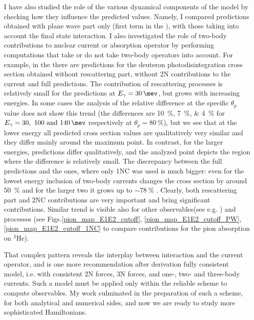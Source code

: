 I have also studied the role of the various dynamical components of the model by checking 
how they influence the predicted values.
Namely, I compared predictions obtained with plane wave part only (first term in the ),
with those taking into account the final state interaction.
I also investigated the role of two-body contributions to nuclear current or absorption operator
by performing computations that take or do not take two-body operators into account.
For example, in the  there are predictions for the deuteron photodisintegration 
cross section obtained 
without rescattering part, without 2N contributions to the current and full predictions.
The contribution of rescattering processes is relatively small for the predictions at $E_\gamma = \SI{30}{\mev}$,
but grows with increasing energies. In some cases the analysis of the relative difference at the specific 
$\theta_p$ value does not show this trend (the differences are \SIlist{10;7;4}{\percent} 
for $E_\gamma=\SIlist[list-units = single]{30;100;140}{\mev}$ respectively at $\theta_p=\SI{80}{\percent}$),
but we see that
at the lower energy all predicted cross section values are qualitatively very similar and they differ
mainly around the maximum point.
In contrast, for the larger energies, predictions differ qualitatively, and the analyzed point 
depicts the region where the difference is relatively small.
The discrepancy between the full predictions and the ones, where only 1NC was used is much bigger:
even for the lowest energy inclusion of two-body currents changes the cross section 
by around \SI{50}{\percent} and for the larger two it grows up to $\sim\SI{78}{\percent}$ .
Clearly, both rescattering part and 2NC contributions are very important and bring significant contributions.
Similar trend is visible also for other observables(see e.g. ) and processes 
(see Figs.\ref{pion_map_E1E2_cutoff}, \ref{pion_map_E1E2_cutoff_PW}, \ref{pion_map_E1E2_cutoff_1NC}
to compare contributions for the pion absorption on $^3$He).

That complex pattern reveals the interplay between interaction and the current operator, and
is one more recommendation after derivation fully consistent model, i.e. with consistent 2N
forces, 3N forces, and one-, two- and three-body currents.
Such a model must be applied only within the reliable scheme to compute observables.
My work culminated in the preparation of such a scheme, for both analytical and numerical
sides, and now we are ready to study more sophisticated Hamiltonians.

